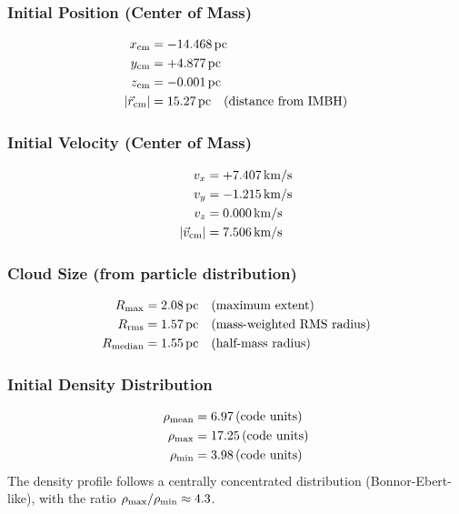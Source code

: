 \documentclass[twocolumn,amsmath,amssymb,prd,superscriptaddress,nofootinbib]{revtex4-2}
\begin{document}
\subsubsection{Initial Position (Center of Mass)}
\begin{align}
    x_{\rm cm} &= -14.468\,{\rm pc} \\
    y_{\rm cm} &= +4.877\,{\rm pc} \\
    z_{\rm cm} &= -0.001\,{\rm pc} \\
    |\vec{r}_{\rm cm}| &= 15.27\,{\rm pc} \quad (\text{distance from IMBH})
\end{align}

\subsubsection{Initial Velocity (Center of Mass)}
\begin{align}
    v_x &= +7.407\,{\rm km/s} \\
    v_y &= -1.215\,{\rm km/s} \\
    v_z &= 0.000\,{\rm km/s} \\
    |\vec{v}_{\rm cm}| &= 7.506\,{\rm km/s}
\end{align}

\subsubsection{Cloud Size (from particle distribution)}
\begin{align}
    R_{\rm max} &= 2.08\,{\rm pc} \quad (\text{maximum extent}) \\
    R_{\rm rms} &= 1.57\,{\rm pc} \quad (\text{mass-weighted RMS radius}) \\
    R_{\rm median} &= 1.55\,{\rm pc} \quad (\text{half-mass radius})
\end{align}

\subsubsection{Initial Density Distribution}
\begin{align}
    \rho_{\rm mean} &= 6.97\,(\text{code units}) \\
    \rho_{\rm max} &= 17.25\,(\text{code units}) \\
    \rho_{\rm min} &= 3.98\,(\text{code units})
\end{align}
The density profile follows a centrally concentrated distribution (Bonnor-Ebert-like), with the ratio $\rho_{\rm max}/\rho_{\rm min} \approx 4.3$.
\end{document}
